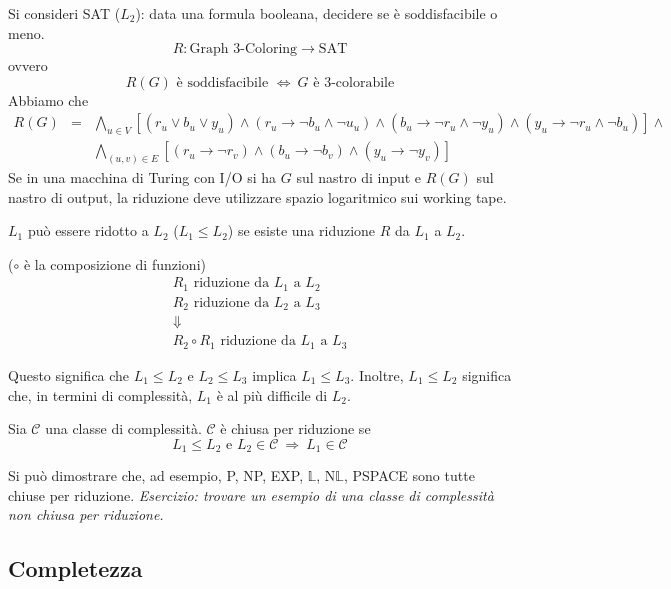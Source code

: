 Si consideri SAT ($L_2$): data una formula booleana, decidere se è soddisfacibile o meno. 
$$
    R:\text{Graph 3-Coloring}\to\text{SAT}
$$
ovvero
$$
    R(G) \text{ è soddisfacibile } \Leftrightarrow~ G \text{ è 3-colorabile}
$$
Abbiamo che 
\begin{eqnarray*}
    R(G) &=& \bigwedge_{u\in V} [(r_u\lor b_u\lor y_u) \land 
    (r_u\to \lnot b_u\land \lnot u_u) \land
    (b_u\to \lnot r_u\land \lnot y_u) \land
    (y_u\to \lnot r_u\land \lnot b_u)] \land\\
    & & \bigwedge_{(u,v)\in E} [(r_u\to \lnot r_v) \land (b_u\to \lnot b_v) \land (y_u\to \lnot y_v)]
\end{eqnarray*}
Se in una macchina di Turing con I/O si ha $G$ sul nastro di input e $R(G)$ sul nastro di output, la riduzione deve utilizzare spazio logaritmico sui working tape.

\begin{definition}[$L_1\leq L_2$]
    $L_1$ può essere ridotto a $L_2$ ($L_1\leq L_2$) se esiste una riduzione $R$ da $L_1$ a $L_2$.
\end{definition}

\begin{property} ($\circ$ è la composizione di funzioni)
    \begin{eqnarray*}
        &R_1 \text{ riduzione da } L_1 \text{ a } L_2&\\
        &R_2 \text{ riduzione da } L_2 \text{ a } L_3&\\
        &\Downarrow&\\
        &R_2\circ R_1 \text{ riduzione da } L_1 \text{ a } L_3&
    \end{eqnarray*}
\end{property}
Questo significa che $L_1\leq L_2$ e $L_2\leq L_3$ implica $L_1\leq L_3$. Inoltre, $L_1\leq L_2$ significa che, in termini di complessità, $L_1$ è al più difficile di $L_2$.

\begin{definition}
    Sia $\mathcal{C}$ una classe di complessità. $\mathcal{C}$ è chiusa per riduzione se
    $$
        L_1\leq L_2 \text{ e } L_2\in\mathcal{C} ~\Rightarrow~ L_1\in\mathcal{C}
    $$
\end{definition}
Si può dimostrare che, ad esempio, P, NP, EXP, $\mathbb{L}$, N$\mathbb{L}$, PSPACE sono tutte chiuse per riduzione. \emph{Esercizio: trovare un esempio di una classe di complessità non chiusa per riduzione.}


\subsection{Completezza}

